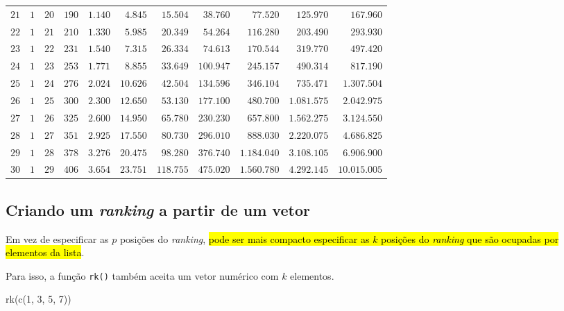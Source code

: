 \documentclass[
  letterpaper,
  DIV=11,
  numbers=noendperiod]{scrreprt}
\newenvironment{Shaded}{\begin{snugshade}}{\end{snugshade}}
\newcommand{\DecValTok}[1]{\textcolor[rgb]{0.68,0.00,0.00}{#1}}
\newcommand{\FunctionTok}[1]{\textcolor[rgb]{0.28,0.35,0.67}{#1}}
\newcommand{\NormalTok}[1]{\textcolor[rgb]{0.00,0.23,0.31}{#1}}
\begin{document}
\begin{longtable*}{l|rrrrrrrrrr}
$21$ & $1$ & $20$ & $190$ & $1.140$ & $4.845$ & $15.504$ & $38.760$ & $77.520$ & $125.970$ & $167.960$ \\ 
$22$ & $1$ & $21$ & $210$ & $1.330$ & $5.985$ & $20.349$ & $54.264$ & $116.280$ & $203.490$ & $293.930$ \\ 
$23$ & $1$ & $22$ & $231$ & $1.540$ & $7.315$ & $26.334$ & $74.613$ & $170.544$ & $319.770$ & $497.420$ \\ 
$24$ & $1$ & $23$ & $253$ & $1.771$ & $8.855$ & $33.649$ & $100.947$ & $245.157$ & $490.314$ & $817.190$ \\ 
$25$ & $1$ & $24$ & $276$ & $2.024$ & $10.626$ & $42.504$ & $134.596$ & $346.104$ & $735.471$ & $1.307.504$ \\ 
$26$ & $1$ & $25$ & $300$ & $2.300$ & $12.650$ & $53.130$ & $177.100$ & $480.700$ & $1.081.575$ & $2.042.975$ \\ 
$27$ & $1$ & $26$ & $325$ & $2.600$ & $14.950$ & $65.780$ & $230.230$ & $657.800$ & $1.562.275$ & $3.124.550$ \\ 
$28$ & $1$ & $27$ & $351$ & $2.925$ & $17.550$ & $80.730$ & $296.010$ & $888.030$ & $2.220.075$ & $4.686.825$ \\ 
$29$ & $1$ & $28$ & $378$ & $3.276$ & $20.475$ & $98.280$ & $376.740$ & $1.184.040$ & $3.108.105$ & $6.906.900$ \\ 
$30$ & $1$ & $29$ & $406$ & $3.654$ & $23.751$ & $118.755$ & $475.020$ & $1.560.780$ & $4.292.145$ & $10.015.005$ \\ 
\bottomrule
\end{longtable*}

\subsection{\texorpdfstring{Criando um \emph{ranking} a partir de um
vetor}{Criando um ranking a partir de um vetor}}\label{criando-um-ranking-a-partir-de-um-vetor}

Em vez de especificar as $p$ posições do \emph{ranking}, {\hl{pode ser
mais compacto especificar as $k$ posições do \emph{ranking} que são
ocupadas por elementos da lista}}.

Para isso, a função \texttt{rk()} também aceita um vetor numérico com
$k$ elementos.

\begin{Shaded}
\begin{Highlighting}[]
\FunctionTok{rk}\NormalTok{(}\FunctionTok{c}\NormalTok{(}\DecValTok{1}\NormalTok{, }\DecValTok{3}\NormalTok{, }\DecValTok{5}\NormalTok{, }\DecValTok{7}\NormalTok{))}
\end{Highlighting}
\end{Shaded}
\end{document}
